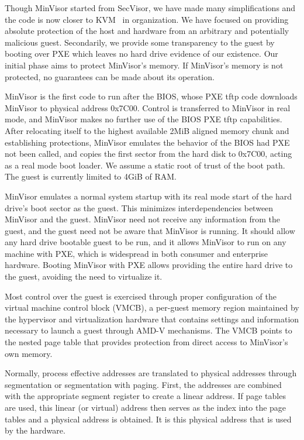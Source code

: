 \documentclass[submission,copyright]{eptcs} \providecommand{\event}{ACL2 2011}
\begin{document}
Though MinVisor started from SecVisor, we have made many
simplifications and the code is now closer to KVM~\cite{KVM} in
organization.  We have focused on providing absolute protection of the
host and hardware from an arbitrary and potentially malicious guest.
Secondarily, we provide some transparency to the guest by booting over
PXE which leaves no hard drive evidence of our existence.  Our initial
phase aims to protect MinVisor's memory.  If MinVisor's memory is not
protected, no guarantees can be made about its operation. 

MinVisor is the first code to run after the BIOS, whose PXE tftp code
downloads MinVisor to physical address 0x7C00.  Control is transferred
to MinVisor in real mode, and MinVisor makes no further use of the
BIOS PXE tftp capabilities.  After relocating itself to the highest available
2MiB aligned memory chunk and establishing protections, MinVisor emulates the behavior of
the BIOS had PXE not been called, and copies the first sector from the
hard disk to 0x7C00, acting as a real mode boot loader.  We assume a
static root of trust of the boot path.  The guest is currently limited
to 4GiB of RAM.

MinVisor emulates a normal system startup with its real mode start of
the hard drive's boot sector as the guest.  This minimizes
interdependencies between MinVisor and the guest.  MinVisor need not
receive any information from the guest, and the guest need not be
aware that MinVisor is running.  It should allow any hard drive
bootable guest to be run, and it allows MinVisor to run on any machine
with PXE, which is widespread in both consumer and enterprise
hardware.  Booting MinVisor with PXE allows providing the entire hard
drive to the guest, avoiding the need to virtualize it.

Most control over the guest is exercised through proper configuration
of the virtual machine control block (VMCB), a per-guest memory region
maintained by the hypervisor and virtualization hardware that contains
settings and information necessary to launch a guest
through AMD-V mechanisms.  The VMCB points to the nested page table
that provides protection from direct access to MinVisor's own memory.




Normally, process effective addresses are translated to physical
addresses through segmentation or segmentation with paging.  First, the
addresses are combined with the appropriate segment register to create
a linear address.  If page tables are used, this linear (or virtual)
address then serves as the index into the page tables and a physical
address is obtained.  It is this physical address that is used by the
hardware.
\end{document}
